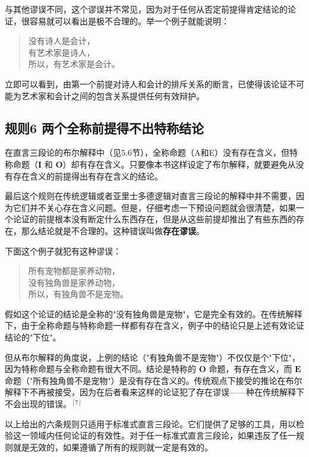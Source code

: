 与其他谬误不同，这个谬误并不常见，因为对于任何从否定前提得肯定结论的论证，很容易就可以看出是极不合理的。举一个例子就能说明：

\begin{quote}
没有诗人是会计，\\
有艺术家是诗人，\\
所以，有艺术家是会计。
\end{quote}

立即可以看到，由第一个前提对诗人和会计的排斥关系的断言，已使得该论证不可能为艺术家和会计之间的包含关系提供任何有效辩护。

\subsection{规则6 两个全称前提得不出特称结论}
在直言三段论的布尔解释中（见5.6节），全称命题（A和E）没有存在含义，但特称命题（$\mathbf{I}$ 和 $\mathbf{O}$）却有存在含义。只要像本书这样设定了布尔解释，就要避免从没有存在含义的前提得出有存在含义的结论。

最后这个规则在传统逻辑或者亚里士多德逻辑对直言三段论的解释中并不需要，因为它们并不关心存在含义问题。但是，仔细考虑一下预设问题就会很清楚，如果一个论证的前提根本没有断定什么东西存在，但是从这些前提却推出了有些东西的存在，那么结论就是不合理的。这种错误叫做\textbf{存在谬误}。

下面这个例子就犯有这种谬误：

\begin{quote}
所有宠物都是家养动物，\\
没有独角兽是家养动物，\\
所以，有独角兽不是宠物。
\end{quote}

假如这个论证的结论是全称的"没有独角兽是宠物"，它是完全有效的。在传统解释下，由于全称命题与特称命题一样都有存在含义，例子中的结论只是上述有效论证结论的"下位"。

但从布尔解释的角度说，上例的结论（"有独角兽不是宠物"）不仅仅是个"下位"，因为特称命题与全称命题有很大不同。结论是特称的 $\mathbf{O}$ 命题，有存在含义，而 $\mathbf{E}$ 命题（"所有独角兽不是宠物"）是没有存在含义的。传统观点下接受的推论在布尔解释下不再被接受，因为在后者看来这样的论证犯了存在谬误——种在传统解释下不会出现的错误。$^{[7]}$

以上给出的六条规则只适用于标准式直言三段论。它们提供了足够的工具，用以检验这一领域内任何论证的有效性。对于任一标准式直言三段论，如果违反了任一规则就是无效的，如果遵循了所有的规则就一定是有效的。



